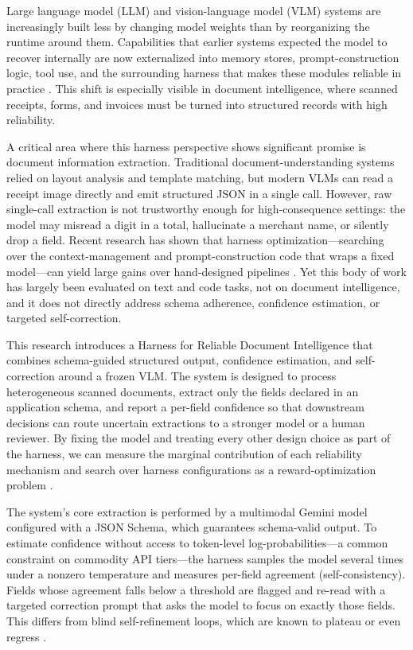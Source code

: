 \documentclass[conference]{IEEEtran}
\begin{document}
Large language model (LLM) and vision-language model (VLM) systems are increasingly built less by changing model weights than by reorganizing the runtime around them. Capabilities that earlier systems expected the model to recover internally are now externalized into memory stores, prompt-construction logic, tool use, and the surrounding harness that makes these modules reliable in practice \cite{b1}. This shift is especially visible in document intelligence, where scanned receipts, forms, and invoices must be turned into structured records with high reliability.

A critical area where this harness perspective shows significant promise is document information extraction. Traditional document-understanding systems relied on layout analysis and template matching, but modern VLMs can read a receipt image directly and emit structured JSON in a single call. However, raw single-call extraction is not trustworthy enough for high-consequence settings: the model may misread a digit in a total, hallucinate a merchant name, or silently drop a field. Recent research has shown that harness optimization---searching over the context-management and prompt-construction code that wraps a fixed model---can yield large gains over hand-designed pipelines \cite{b2}. Yet this body of work has largely been evaluated on text and code tasks, not on document intelligence, and it does not directly address schema adherence, confidence estimation, or targeted self-correction.

This research introduces a Harness for Reliable Document Intelligence that combines schema-guided structured output, confidence estimation, and self-correction around a frozen VLM. The system is designed to process heterogeneous scanned documents, extract only the fields declared in an application schema, and report a per-field confidence so that downstream decisions can route uncertain extractions to a stronger model or a human reviewer. By fixing the model and treating every other design choice as part of the harness, we can measure the marginal contribution of each reliability mechanism and search over harness configurations as a reward-optimization problem \cite{b2}.

The system's core extraction is performed by a multimodal Gemini model configured with a JSON Schema, which guarantees schema-valid output. To estimate confidence without access to token-level log-probabilities---a common constraint on commodity API tiers---the harness samples the model several times under a nonzero temperature and measures per-field agreement (self-consistency). Fields whose agreement falls below a threshold are flagged and re-read with a targeted correction prompt that asks the model to focus on exactly those fields. This differs from blind self-refinement loops, which are known to plateau or even regress \cite{b3}.
\end{document}
